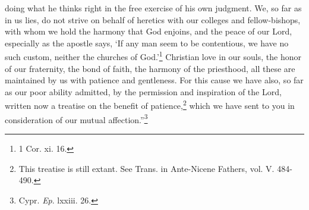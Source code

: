 doing what he thinks right in the free exercise of his own judgment. We, so far as in us lies, do not strive on behalf of heretics with our colleges and fellow-bishops, with whom we hold the harmony that God enjoins, and the peace of our Lord, especially as the apostle says, ‘If any man seem to be contentious, we have no such custom, neither the churches of God.’\footnote{\par  1 Cor. xi. 16.} Christian love in our souls, the honor of our fraternity, the bond of faith, the harmony of the priesthood, all these are maintained by us with patience and gentleness. For this cause we have also, so far as our poor ability admitted, by the permission and inspiration of the Lord, written now a treatise on the benefit of patience,\footnote{\par  This treatise is still extant. See Trans. in Ante-Nicene Fathers, vol. V. 484-490.} which we have sent to you in consideration of our mutual affection.''\footnote{\par  Cypr. \emph{Ep}. lxxiii. 26.}


